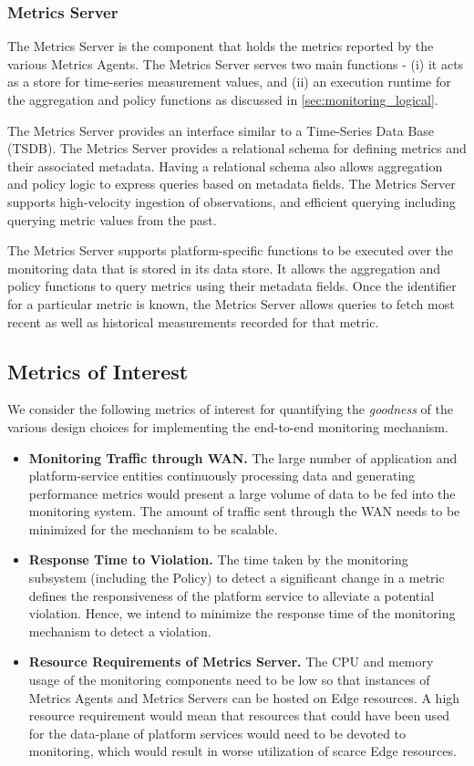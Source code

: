 \subsubsection{Metrics Server}
The Metrics Server is the component that holds the metrics reported by the various Metrics Agents. The Metrics Server serves two main functions - (i) it acts as a store for time-series measurement values, and (ii) an execution runtime for the aggregation and policy functions as discussed in \cref{sec:monitoring_logical}. 
\par The Metrics Server provides an interface similar to a Time-Series Data Base (TSDB). The Metrics Server provides a relational schema for defining metrics and their associated metadata. Having a relational schema also allows aggregation and policy logic to express queries based on metadata fields. The Metrics Server supports high-velocity ingestion of observations, and efficient querying including querying metric values from the past.
\par The Metrics Server supports platform-specific functions to be executed over the monitoring data that is stored in its data store. It allows the aggregation and policy functions to query metrics using their metadata fields. Once the identifier for a particular metric is known, the Metrics Server allows queries to fetch most recent as well as historical measurements recorded for that metric.

\subsection{Metrics of Interest}
We consider the following metrics of interest for quantifying the \textit{goodness} of the various design choices for implementing the end-to-end monitoring mechanism.
\begin{itemize}
\item \textbf{Monitoring Traffic through WAN. } The large number of application and platform-service entities continuously processing data and generating performance metrics would present a large volume of data to be fed into the monitoring system. The amount of traffic sent through the WAN needs to be minimized for the mechanism to be scalable.
\item \textbf{Response Time to Violation. }The time taken by the monitoring subsystem (including the Policy) to detect a significant change in a metric defines the responsiveness of the platform service to alleviate a potential violation. Hence, we intend to minimize the response time of the monitoring mechanism to detect a violation.
\item \textbf{Resource Requirements of Metrics Server. } The CPU and memory usage of the monitoring components need to be low so that instances of Metrics Agents and Metrics Servers can be hosted on Edge resources. A high resource requirement would mean that resources that could have been used for the data-plane of platform services would need to be devoted to monitoring, which would result in worse utilization of scarce Edge resources.
\end{itemize}


